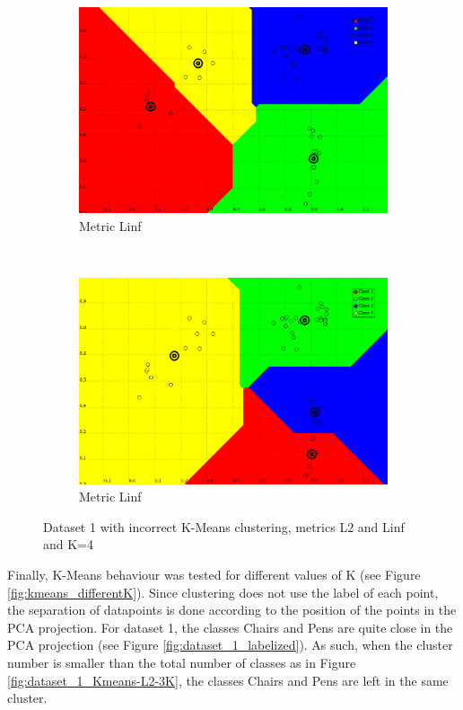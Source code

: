 \documentclass[a4paper,10pt]{article}
\begin{document}
\begin{figure}[H]
\begin{subfigure}[t]{0.2\textwidth}
      \includegraphics[width=\textwidth]{pictures/dataset_1_Kmeans-4K-Linf-wrong}
      \caption{Metric Linf}
      \label{fig:dataset_1_Kmeans-4K-Linf-wrong}
     \end{subfigure}
      ~
    \begin{subfigure}[t]{0.2\textwidth}
      \centering
      \includegraphics[width=\textwidth]{pictures/dataset_1_Kmeans-4K-Linf-wrong2}
      \caption{Metric Linf}
      \label{fig:dataset_1_Kmeans-4K-Linf-wrong2}
     \end{subfigure}
     \caption{Dataset 1 with incorrect K-Means clustering, metrics L2 and Linf and K=4}
     \label{fig:bad_kmeans}
\end{figure}

Finally, K-Means behaviour was tested for different values of K (see Figure \ref{fig:kmeans_differentK}). Since clustering does not use the label of each point, the separation of datapoints is done according to the position of the points in the PCA projection. For dataset 1, the classes Chairs and Pens are quite close in the PCA projection (see Figure \ref{fig:dataset_1_labelized}). As such, when the cluster number is smaller than the total number of classes as in Figure \ref{fig:dataset_1_Kmeans-L2-3K}, the classes Chairs and Pens are left in the same cluster.
\end{document}
